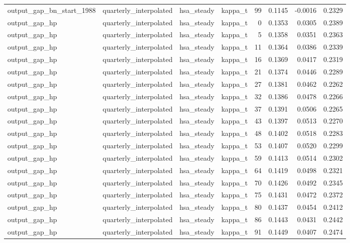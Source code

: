 \begin{tabular}{llllrrrr}
output\_gap\_bn\_start\_1988 & quarterly\_interpolated & hsa\_steady & kappa\_t & 99 & 0.1145 & -0.0016 & 0.2329 \\
output\_gap\_hp & quarterly\_interpolated & hsa\_steady & kappa\_t & 0 & 0.1353 & 0.0305 & 0.2389 \\
output\_gap\_hp & quarterly\_interpolated & hsa\_steady & kappa\_t & 5 & 0.1358 & 0.0351 & 0.2363 \\
output\_gap\_hp & quarterly\_interpolated & hsa\_steady & kappa\_t & 11 & 0.1364 & 0.0386 & 0.2339 \\
output\_gap\_hp & quarterly\_interpolated & hsa\_steady & kappa\_t & 16 & 0.1369 & 0.0417 & 0.2319 \\
output\_gap\_hp & quarterly\_interpolated & hsa\_steady & kappa\_t & 21 & 0.1374 & 0.0446 & 0.2289 \\
output\_gap\_hp & quarterly\_interpolated & hsa\_steady & kappa\_t & 27 & 0.1381 & 0.0462 & 0.2262 \\
output\_gap\_hp & quarterly\_interpolated & hsa\_steady & kappa\_t & 32 & 0.1386 & 0.0478 & 0.2266 \\
output\_gap\_hp & quarterly\_interpolated & hsa\_steady & kappa\_t & 37 & 0.1391 & 0.0506 & 0.2265 \\
output\_gap\_hp & quarterly\_interpolated & hsa\_steady & kappa\_t & 43 & 0.1397 & 0.0513 & 0.2270 \\
output\_gap\_hp & quarterly\_interpolated & hsa\_steady & kappa\_t & 48 & 0.1402 & 0.0518 & 0.2283 \\
output\_gap\_hp & quarterly\_interpolated & hsa\_steady & kappa\_t & 53 & 0.1407 & 0.0520 & 0.2299 \\
output\_gap\_hp & quarterly\_interpolated & hsa\_steady & kappa\_t & 59 & 0.1413 & 0.0514 & 0.2302 \\
output\_gap\_hp & quarterly\_interpolated & hsa\_steady & kappa\_t & 64 & 0.1419 & 0.0498 & 0.2321 \\
output\_gap\_hp & quarterly\_interpolated & hsa\_steady & kappa\_t & 70 & 0.1426 & 0.0492 & 0.2345 \\
output\_gap\_hp & quarterly\_interpolated & hsa\_steady & kappa\_t & 75 & 0.1431 & 0.0472 & 0.2372 \\
output\_gap\_hp & quarterly\_interpolated & hsa\_steady & kappa\_t & 80 & 0.1437 & 0.0454 & 0.2412 \\
output\_gap\_hp & quarterly\_interpolated & hsa\_steady & kappa\_t & 86 & 0.1443 & 0.0431 & 0.2442 \\
output\_gap\_hp & quarterly\_interpolated & hsa\_steady & kappa\_t & 91 & 0.1449 & 0.0407 & 0.2474 \\

\end{tabular}
